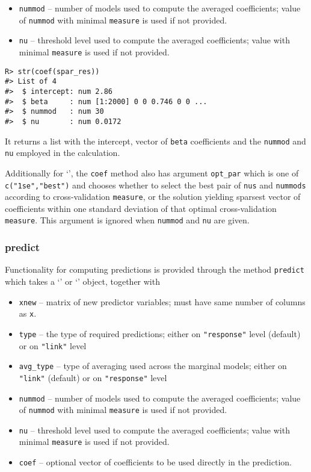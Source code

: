 \documentclass[
  article,
  nojss]{jss}
\newcommand{\class}[1]{`\code{#1}'}
\begin{document}
\begin{itemize}
\item
  \texttt{nummod} -- number of models used to compute the averaged
  coefficients; value of \texttt{nummod} with minimal \texttt{measure}
  is used if not provided.
\item
  \texttt{nu} -- threshold level used to compute the averaged
  coefficients; value with minimal \texttt{measure} is used if not
  provided.
\end{itemize}

\begin{verbatim}
R> str(coef(spar_res))
#> List of 4
#>  $ intercept: num 2.86
#>  $ beta     : num [1:2000] 0 0 0.746 0 0 ...
#>  $ nummod   : num 30
#>  $ nu       : num 0.0172
\end{verbatim}

It returns a list with the intercept, vector of \texttt{beta}
coefficients and the \texttt{nummod} and \texttt{nu} employed in the
calculation.

Additionally for \class{spar.cv}, the \texttt{coef} method also has
argument \texttt{opt\_par} which is one of \texttt{c("1se","best")} and
chooses whether to select the best pair of \texttt{nus} and
\texttt{nummods} according to cross-validation \texttt{measure}, or the
solution yielding sparsest vector of coefficients within one standard
deviation of that optimal cross-validation \texttt{measure}. This
argument is ignored when \texttt{nummod} and \texttt{nu} are given.

\subsubsection{predict}\label{predict}

Functionality for computing predictions is provided through the method
\texttt{predict} which takes a \class{spar} or \class{spar.cv} object,
together with

\begin{itemize}
\item
  \texttt{xnew} -- matrix of new predictor variables; must have same
  number of columns as \texttt{x}.
\item
  \texttt{type} -- the type of required predictions; either on
  \texttt{"response"} level (default) or on \texttt{"link"} level
\item
  \texttt{avg\_type} -- type of averaging used across the marginal
  models; either on \texttt{"link"} (default) or on \texttt{"response"}
  level
\item
  \texttt{nummod} -- number of models used to compute the averaged
  coefficients; value of \texttt{nummod} with minimal \texttt{measure}
  is used if not provided.
\item
  \texttt{nu} -- threshold level used to compute the averaged
  coefficients; value with minimal \texttt{measure} is used if not
  provided.
\item
  \texttt{coef} -- optional vector of coefficients to be used directly
  in the prediction.
\end{itemize}
\end{document}
